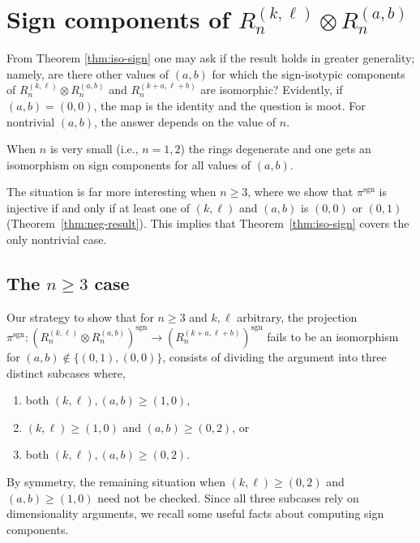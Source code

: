 \documentclass[11pt, reqno]{amsart}
\theoremstyle{definition}
\theoremstyle{remark}
\numberwithin{equation}{section}
\newcommand{\0}{\emptyset}
\DeclareMathOperator{\sgn}{sgn}
\begin{document}
\section{Sign components of \texorpdfstring{$R_n^{(k,\ell)} \otimes R_n^{(a,b)}$}{Rn(k,l)xRn(a,b)}}\label{sec:miniswaddle}

From Theorem \ref{thm:iso-sign} one may ask if the result holds in greater generality; namely, are there other values of $(a,b)$ for which the sign-isotypic components of $R_n^{(k,\ell)} \otimes R_n^{(a,b)}$ and $R_n^{(k+a,\ell+b)}$ are isomorphic? Evidently, if $(a,b)=(0,0)$, the map is the identity and the question is moot. For nontrivial $(a,b)$, the answer depends on the value of $n$. 

When $n$ is very small (i.e., $n=1,2$) the rings degenerate and one gets an isomorphism on sign components for all values of $(a,b)$. 

The situation is far more interesting when $n\geq 3$, where we show that $\pi^{\sgn}$ is injective if and only if at least one of $(k,\ell)$ and $(a,b)$ is $(0,0)$ or $(0,1)$ (Theorem~\ref{thm:neg-result}). 
This implies that Theorem~\ref{thm:iso-sign} covers the only nontrivial case.

\subsection{The \texorpdfstring{$n\geq 3$}{n>=3} case}\label{subsec:greater-than-3} 
Our strategy to show that for $n\geq 3$ and $k,\ell$ arbitrary, the projection $\pi^{\sgn}: \left(R_n^{(k,\ell)}\otimes R_n^{(a,b)}\right)^{\sgn} \to \left(R_n^{(k+a,\ell+b)}\right)^{\sgn}$ fails to be an isomorphism for $(a,b) \not\in \{(0,1), (0,0)\}$, consists of dividing the argument into three distinct subcases where,
\begin{enumerate}
    \item  both $ (k,\ell), (a,b) \geq (1,0)$, 
    \item  $ (k,\ell)\geq (1,0)$ and $(a,b) \geq (0,2)$, or 
    \item both $ (k,\ell), (a,b) \geq (0,2)$.
\end{enumerate} 
By symmetry, the remaining situation when $ (k,\ell)\geq (0,2)$ and $(a,b) \geq (1,0)$ need not be checked. Since all three subcases rely on dimensionality arguments, we recall some useful facts about computing sign components. 
\end{document}
